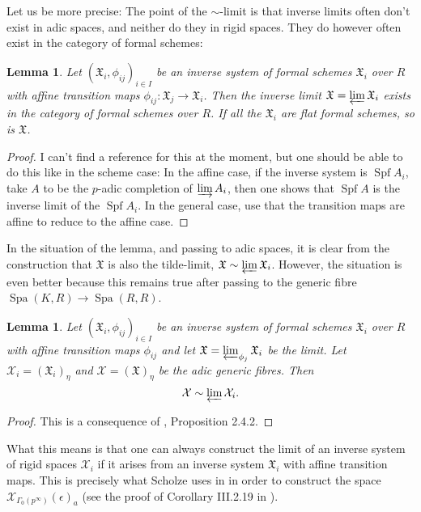 \documentclass[11pt,oneside]{amsart}
\newtheorem{lemma}[theorem]{Lemma}
\theoremstyle{definition}
\theoremstyle{remark}
\begin{document}
	Let us be more precise: The point of the $\sim$-limit is that inverse limits often don't exist in adic spaces, and neither do they in rigid spaces. They do however often exist in the category of formal schemes:
	\begin{lemma}
		Let $(\mathfrak X_i,\phi_{ij})_{i\in I}$ be an inverse system of formal schemes $\mathfrak X_i$ over $R$ with affine transition maps $\phi_{ij}:\mathfrak X_j\rightarrow \mathfrak X_i$. Then the inverse limit $\mathfrak X=\varprojlim \mathfrak X_i$ exists in the category of formal schemes over $R$. If all the $\mathfrak X_i$ are flat formal schemes, so is $\mathfrak X$.
	\end{lemma}
	\begin{proof}
		I can't find a reference for this at the moment, but one should be able to do this like in the scheme case: In the affine case, if the inverse system is $\operatorname{Spf} A_i$, take $A$ to be the $p$-adic completion of $\varinjlim A_i$, then one shows that $\operatorname{Spf} A$ is the inverse limit of the $\operatorname{Spf}A_i$. In the general case, use that the transition maps are affine to reduce to the affine case.
	\end{proof}
	In the situation of the lemma, and passing to adic spaces, it is clear from the construction that $\mathfrak X$ is also the tilde-limit, $\mathfrak X\sim \varprojlim \mathfrak X_i$. However, the situation is even better because this remains true after passing to the generic fibre $\operatorname{Spa}(K,R)\rightarrow \operatorname{Spa}(R,R)$.
	\begin{lemma}\label{tilde-limit from adic generic fibre of formal schemes}
		Let $(\mathfrak X_i,\phi_{ij})_{i\in I}$ be an inverse system of formal schemes $\mathfrak X_i$ over $R$ with affine transition maps $\phi_{ij}$ and let $\mathfrak X=\varprojlim_{\phi_j} \mathfrak X_i$ be the limit. Let $\mathcal X_i =(\mathfrak X_i)_\eta$ and  $\mathcal X = (\mathfrak X)_\eta$ be the adic generic fibres. Then
		\[\mathcal X \sim \varprojlim \mathcal X_i.\]
	\end{lemma}
	\begin{proof}
		This is a consequence of \cite{SW}, Proposition 2.4.2.
	\end{proof}
	
	What this means is that one can always construct the limit of an inverse system of rigid spaces $\mathcal X_i$ if it arises from an inverse system $\mathfrak X_i$ with affine transition maps. This is precisely what Scholze uses in \cite{torsion} in order to construct the space $\mathcal X_{\Gamma_0(p^\infty)}(\epsilon)_a$ (see the proof of Corollary III.2.19 in \cite{torsion}).
	
\end{document}
